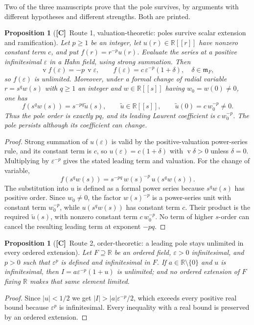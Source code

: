 \documentclass[11pt,letterpaper]{article}
\numberwithin{equation}{section}
\newtheorem{proposition}[theorem]{Proposition}
\theoremstyle{definition}
\theoremstyle{remark}
\newcommand{\R}{\mathbb R}
\newcommand{\eps}{\varepsilon}
\newcommand{\mm}{\mathfrak m}
\DeclareMathOperator{\val}{v}
\newcommand{\abs}[1]{\lvert#1\rvert}
\newcommand{\TC}{\textcolor{TierC}{\textsf{\bfseries[C]}}}
\begin{document}
Two of the three manuscripts prove that the pole survives, by arguments with
different hypotheses and different strengths. Both are printed.

\begin{proposition}[\TC\ Route 1, valuation-theoretic: poles survive scalar
extension and ramification]
\label{phys:prop:pole}
Let $p\ge1$ be an integer, let $u(r)\in\R[[r]]$ have nonzero constant term $c$,
and put $f(r)=r^{-p}u(r)$. Evaluate the series at a positive infinitesimal
$\eps$ in a Hahn field, using strong summation. Then
\[
\val f(\eps)=-p\,\val\eps,
\qquad
f(\eps)=c\,\eps^{-p}(1+\delta),\quad \delta\in\mm_{F},
\]
so $f(\eps)$ is unlimited. Moreover, under a formal change of radial variable
$r=s^{q}w(s)$ with $q\ge1$ an integer and $w\in\R[[s]]$ having
$w_0=w(0)\ne0$, one has
\[
 f(s^{q}w(s))=s^{-pq}\widetilde u(s),\qquad
 \widetilde u\in\R[[s]],\qquad \widetilde u(0)=c\,w_0^{-p}\ne0.
\]
Thus the pole order is exactly $pq$, and its leading Laurent coefficient
is $c\,w_0^{-p}$. The pole persists although its coefficient can change.
\end{proposition}
\begin{proof}
Strong summation of $u(\eps)$ is valid by the positive-valuation power-series
rule, and its constant term is $c$, so $u(\eps)=c(1+\delta)$ with
$\val\delta>0$ unless $\delta=0$. Multiplying by $\eps^{-p}$ gives the stated
leading term and valuation. For the change of variable,
\[
f(s^{q}w(s))=s^{-pq}\,w(s)^{-p}\,u(s^{q}w(s)).
\]
The substitution into $u$ is defined as a formal power series because
$s^q w(s)$ has positive order. Since $w_0\ne0$, the factor $w(s)^{-p}$
is a power-series unit with constant term $w_0^{-p}$, while
$u(s^q w(s))$ has constant term $c$. Their product is the required
$\widetilde u(s)$, with nonzero constant term $c\,w_0^{-p}$. No term of
higher $s$-order can cancel the resulting leading term at exponent $-pq$.
\end{proof}

\begin{proposition}[\TC\ Route 2, order-theoretic: a leading pole stays
unlimited in every ordered extension]
\label{phys:prop:unlimited}
Let $F\supseteq\R$ be an ordered field, $\eps>0$ infinitesimal, and $p>0$ such
that $\eps^{p}$ is defined and infinitesimal in $F$. If
$a\in\R\setminus\{0\}$ and $u$ is infinitesimal, then
$I=a\eps^{-p}(1+u)$ is unlimited; and \emph{no} ordered extension of $F$ fixing
$\R$ makes that same element limited.
\end{proposition}
\begin{proof}
Since $\abs u<1/2$ we get $\abs I>\abs a\eps^{-p}/2$, which exceeds every
positive real bound because $\eps^{p}$ is infinitesimal. Every inequality with
a real bound is preserved by an ordered extension.
\end{proof}
\end{document}
